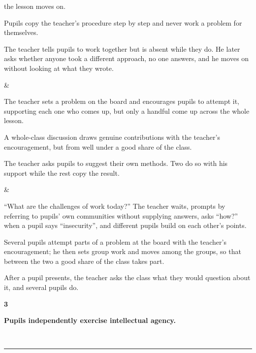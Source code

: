 \documentclass[10pt,a4paper]{article}
\newcommand{\exlistsize}{\scriptsize}
\newcommand{\conceptheader}[2]{%
  \noindent
  \begin{minipage}[c]{13mm}\raggedright
    {\fontsize{30}{30}\selectfont\bfseries\color{tnavy}#1}
  \end{minipage}%
  \begin{minipage}[c]{\dimexpr\linewidth-13mm\relax}\RaggedRight
    {\large\bfseries #2}
  \end{minipage}\\[1.5mm]
  \textcolor{tnavy}{\rule{\linewidth}{1.1pt}}\\[2mm]}
\begin{document}
{\begin{exlist}
        the lesson moves on.
  \item Pupils copy the teacher's procedure step by step and never work a problem for themselves.
  \item The teacher tells pupils to work together but is absent while they do. He later asks whether anyone
        took a different approach, no one answers, and he moves on without looking at what they wrote.
\end{exlist} &
\exlistsize\begin{exlist}
  \item The teacher sets a problem on the board and encourages pupils to attempt it, supporting each one who
        comes up, but only a handful come up across the whole lesson.
  \item A whole-class discussion draws genuine contributions with the teacher's encouragement, but from well
        under a good share of the class.
  \item The teacher asks pupils to suggest their own methods. Two do so with his support while the rest copy
        the result.
\end{exlist} &
\exlistsize\begin{exlist}
  \item ``What are the challenges of work today?'' The teacher waits, prompts by referring to pupils' own
        communities without supplying answers, asks ``how?'' when a pupil says ``insecurity'', and different
        pupils build on each other's points.
  \item Several pupils attempt parts of a problem at the board with the teacher's encouragement; he then
        sets group work and moves among the groups, so that between the two a good share of the class takes
        part.
  \item After a pupil presents, the teacher asks the class what they would question about it, and several
        pupils do.
\end{exlist}
}
 

\clearpage


\conceptheader{3}{Pupils independently exercise intellectual agency.}
 
\end{document}

